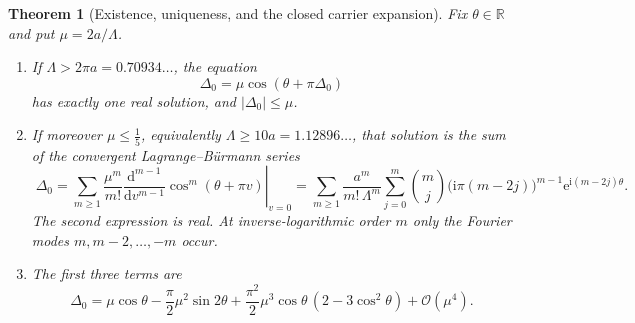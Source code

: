 \documentclass[11pt,a4paper,oneside]{book}
\theoremstyle{plain}
\newtheorem{theorem}{Theorem}[chapter]
\theoremstyle{definition}
\theoremstyle{remark}
\newcommand{\Real}{\mathbb{R}}
\newcommand{\e}{\mathrm{e}}
\newcommand{\ii}{\mathrm{i}}
\newcommand{\dd}{\mathrm{d}}
\newcommand{\bigO}{\mathcal{O}}
\begin{document}
\begin{theorem}[Existence, uniqueness, and the closed carrier expansion]
\label{p2:thm:carrier}
Fix \(\theta\in\Real\) and put \(\mu=2a/\Lambda\).
\begin{enumerate}[label=\textup{(\alph*)}]
\item If \(\Lambda>2\pi a=0.70934\ldots\), the equation
      \begin{equation}
       \Delta_0=\mu\cos(\theta+\pi\Delta_0)
       \label{p2:eq:carrier-eq}
      \end{equation}
      has exactly one real solution, and \(|\Delta_0|\le\mu\).
\item If moreover \(\mu\le\tfrac15\), equivalently
      \(\Lambda\ge10a=1.12896\ldots\), that solution is the sum of the
      convergent Lagrange--B\"urmann series
      \begin{equation}
       \boxed{\;
       \Delta_0=\sum_{m\ge1}\frac{\mu^m}{m!}
       \left.\frac{\dd^{m-1}}{\dd v^{m-1}}\cos^m(\theta+\pi v)\right|_{v=0}
       =\sum_{m\ge1}\frac{a^m}{m!\,\Lambda^m}
        \sum_{j=0}^{m}\binom mj\bigl(\ii\pi(m-2j)\bigr)^{m-1}
        \e^{\ii(m-2j)\theta} . \;}
       \label{p2:eq:carrier-series}
      \end{equation}
      The second expression is real.  At inverse-logarithmic order \(m\) only
      the Fourier modes \(m,m-2,\dots,-m\) occur.
\item The first three terms are
      \begin{equation}
       \Delta_0=\mu\cos\theta-\frac\pi2\mu^2\sin2\theta
       +\frac{\pi^2}2\mu^3\cos\theta\,(2-3\cos^2\theta)+\bigO(\mu^4).
       \label{p2:eq:carrier-first}
      \end{equation}
\end{enumerate}
\end{theorem}
\end{document}

